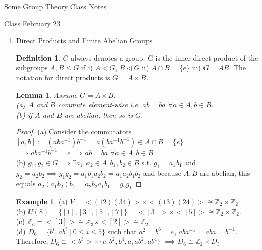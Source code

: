 \documentclass[11pt]{article}
\newtheorem{lem}[thm]{Lemma}
\theoremstyle{definition}
\newtheorem{definition}[thm]{Definition}
\newtheorem{example}[thm]{Example}
\numberwithin{equation}{section}
\newcommand{\Z}{\mathbb{Z}}
\begin{document}
\begin{center}
{\sf\LARGE Some Group Theory Class Notes}
\end{center}

\begin{center}
{\sf\LARGE Class February 23}
\end{center}

\begin{enumerate} %

\item Direct Products and Finite Abelian Groups
\begin{definition}
$G$ always denotes a group. G is the inner direct product of the subgroups $A, B \leq G$ if i) $A \vartriangleleft G$, $B \vartriangleleft G$ ii) $A \cap B = \{e\}$ iii) $G = AB$. The notation for direct products is $G = A \times B$.
\end{definition}
\begin{lem}
Assume $G = A \times B$. \\
(a) $A$ and $B$ commute element-wise i.e. $ab = ba$ $\forall a \in A, b \in B$.\\
(b) if $A$ and $B$ are abelian, then so is $G$.
\end{lem}
\begin{proof}
(a) Consider the commutators $[a, b] := (aba^{-1})b^{-1} = a(ba^{-1}b^{-1}) \in A \cap B = \{e\}$\\
$\implies aba^{-1}b^{-1} = e \implies ab = ba$ $\forall a \in A, b \in B$\\
(b) $g_1, g_2 \in G \implies \exists a_1, a_2 \in A, b_1, b_2 \in B$ s.t. $g_1 = a_{1}b_{1}$ and $g_2 = a_{2}b_{2} \implies g_{1}g_{2} = a_{1}b_{1}a_{2}b_{2} = a_{1}a_{2}b_{1}b_{2}$ and because $A, B$ are abelian, this equals $a_{2}(a_{1}b_{2})b_{1} = a_{2}b_{2}a_{1}b_{1} = g_{2}g_{1}$
\end{proof}
\begin{example}
(a) $V = <(12)(34)> \times <(13)(24)> \cong \Z_2 \times \Z_2 $\\
(b) $U(8) = \{[1], [3], [5], [7]\} = <[3]> \times <[5]> \cong \Z_2 \times \Z_2$.\\
(c) $\Z_6 = <[3]> \cong \Z_3 \times <[2]> \cong \Z_2$\\
(d) $D_6 = \{b^{i}, ab^{i} \mid 0 \leq i \leq 5 \}$ such that $a^{2} = b^{6} = e$, $aba^{-1} = aba = b^{-1}$. Therefore, $D_6 \cong <b^{3}> \times \{e, b^{2}, b^{4}, a, ab^{2}, ab^{4}\}$ $\implies D_6 \cong \Z_2 \times D_3$\\

\end{example}
\end{enumerate}
\end{document}
